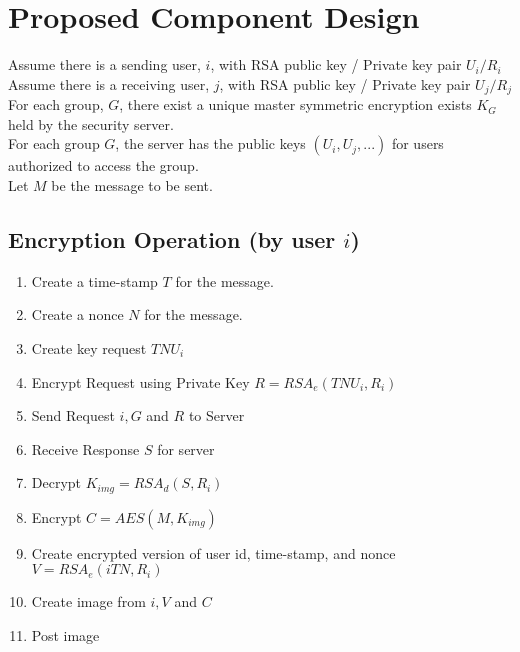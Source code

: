 \documentclass[11pt]{article}
\begin{document}
\section{Proposed Component Design}
Assume there is a sending user, $i$, with RSA public key / Private key pair $U_{i} / R_{i}$\\
Assume there is a receiving user, $j$, with RSA public key / Private key pair $U_{j} / R_{j}$\\
For each group, $G$,  there exist a unique master symmetric encryption exists $K_{G}$ held by the security server.\\
For each group $G$, the server has the public keys $(U_{i}, U_{j}, ...)$ for users authorized to access the group.\\
Let $M$ be the message to be sent.

\subsection{Encryption Operation (by user $i$)}
\begin{enumerate}
  \item Create a time-stamp $T$ for the message.
  \item Create a nonce $N$ for the message.
  \item Create key request $TNU_{i}$
  \item Encrypt Request using Private Key $R = RSA_{e}(TNU_{i},R_{i})$
  \item Send Request $i, G$ and $R$ to Server
  \item Receive Response $S$ for server
  \item Decrypt $K_{img} = RSA_{d}(S,R_{i})$
  \item Encrypt $C = AES(M,K_{img})$
  \item Create encrypted version of user id, time-stamp, and nonce $V = RSA_{e}(iTN,R_{i})$
  \item Create image from $i, V$ and $C$
  \item Post image
\end{enumerate}
\end{document}
